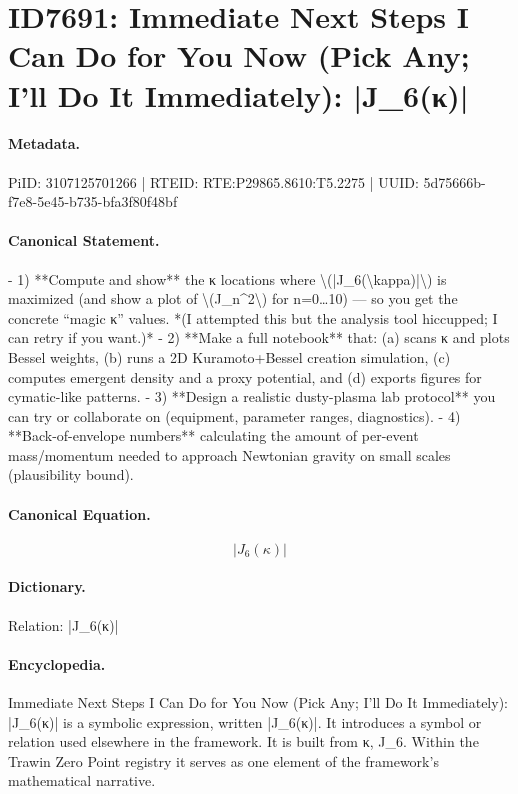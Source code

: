 \section*{ID7691: Immediate Next Steps I Can Do for You Now (Pick Any; I’ll Do It Immediately): |J\_6(κ)|}
\paragraph{Metadata.}
PiID: 3107125701266 | RTEID: RTE:P29865.8610:T5.2275 | UUID: 5d75666b-f7e8-5e45-b735-bfa3f80f48bf

\paragraph{Canonical Statement.}
- 1) **Compute and show** the κ locations where \textbackslash{}(|J\_6(\textbackslash{}kappa)|\textbackslash{}) is maximized (and show a plot of \textbackslash{}(J\_n\textasciicircum{}2\textbackslash{}) for n=0…10) — so you get the concrete “magic κ” values. *(I attempted this but the analysis tool hiccupped; I can retry if you want.)* - 2) **Make a full notebook** that: (a) scans κ and plots Bessel weights, (b) runs a 2D Kuramoto+Bessel creation simulation, (c) computes emergent density and a proxy potential, and (d) exports figures for cymatic-like patterns. - 3) **Design a realistic dusty-plasma lab protocol** you can try or collaborate on (equipment, parameter ranges, diagnostics). - 4) **Back-of-envelope numbers** calculating the amount of per-event mass/momentum needed to approach Newtonian gravity on small scales (plausibility bound).

\paragraph{Canonical Equation.}
\[
|J_6(\kappa)|
\]

\paragraph{Dictionary.}
Relation: |J\_6(κ)|

\paragraph{Encyclopedia.}
Immediate Next Steps I Can Do for You Now (Pick Any; I’ll Do It Immediately): |J\_6(κ)| is a symbolic expression, written |J\_6(κ)|. It introduces a symbol or relation used elsewhere in the framework. It is built from κ, J\_6. Within the Trawin Zero Point registry it serves as one element of the framework's mathematical narrative.
